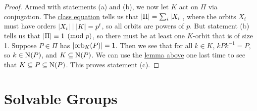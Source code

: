 \begin{proof}
    Armed with statements (a) and (b),
    we now let \(K\) act on \(\Pi\) via conjugation.
    The \hyperref[thm:class-equation]{class equation} tells us that
    \(\abs{\Pi} = \sum_i \abs{X_i}\),
    where the orbits \(X_i\)
    must have orders \(\abs{X_i} \mid \abs{K} = p^t\),
    so all orbits are powers of \(p\).
    But statement (b) tells us that \(\abs{\Pi} \equiv 1 \pmod{p}\),
    so there must be at least one \(K\)-orbit that is of size 1.
    Suppose \(P \in \Pi\) has \(\abs{\operatorname{orb}_K(P)} = 1\).
    Then we see that for all \(k \in K\), \(kPk^{-1} = P\),
    so \(k \in \operatorname{N}(P)\), and \(K \subseteq \operatorname{N}(P)\).
    We can use the \hyperref[lem:prime-power-sylow-subgroup]{lemma above}
    one last time
    to see that \(K \subseteq P \subseteq \operatorname{N}(P)\).
    This proves statement (c).
\end{proof}


\section{Solvable Groups}

